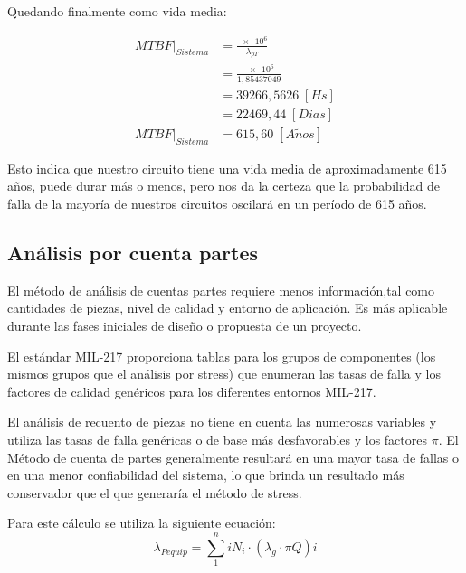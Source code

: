 \documentclass{article}
\begin{document}
Quedando finalmente como vida media:

\begin{align*}
{MTBF}\bigr|_{Sistema} 	&= \frac{\num{e6}}{\lambda_{pT}} \\
						&= \frac{\num{e6}}{1,85437049 } \\
						&= 39266,5626  \; [Hs] \\
						&= 22469,44  \;   [Dias] \\
{MTBF}\bigr|_{Sistema}	&= 615,60 \;  [A\tilde{n}os] 
\end{align*}

Esto indica que nuestro circuito tiene una vida media de aproximadamente 615 años, puede durar más o menos, pero nos da la certeza que  la probabilidad de falla de la mayoría de nuestros circuitos oscilará en un período de 615 años.

\subsection{Análisis por cuenta partes}
El método de análisis de cuentas partes requiere menos información,tal como cantidades de piezas, nivel de calidad y entorno de aplicación. Es más aplicable durante las fases iniciales de diseño o propuesta de un proyecto. 

El estándar MIL-217 proporciona tablas para los grupos de componentes (los mismos grupos que el análisis por stress) que enumeran las tasas de falla y los factores de calidad genéricos para los diferentes entornos MIL-217.

El análisis de recuento de piezas no tiene en cuenta las numerosas variables y utiliza las tasas de falla genéricas o de base más desfavorables y los factores $\pi$. El Método de cuenta de partes generalmente resultará en una mayor tasa de fallas o en una menor confiabilidad del sistema, lo que brinda un resultado más conservador que el que generaría el método de stress.

Para este cálculo se utiliza la siguiente ecuación:
\begin{equation}
	\lambda_{Pequip} = \sum_{1}^{n} i N_i  \cdot (\lambda_g  \cdot \pi Q) i
\end{equation}
\end{document}
